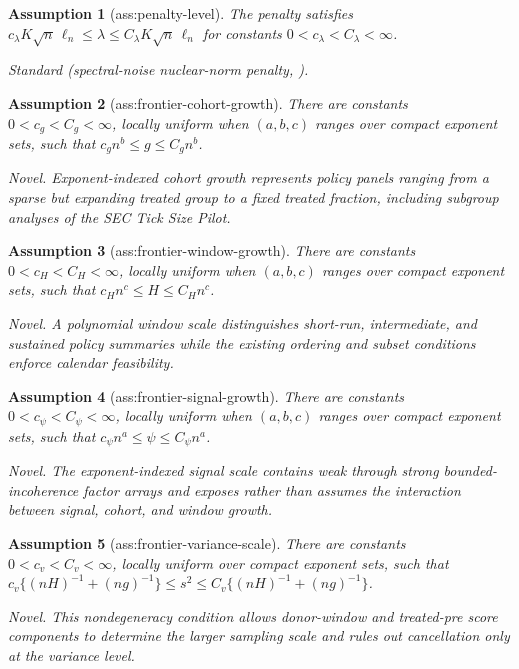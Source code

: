 \documentclass{article}
\newtheorem{assumption}{Assumption}
\begin{document}
\begin{assumption}[ass:penalty-level]\label{ass:penalty-level}
The penalty satisfies \(c_\lambda K\sqrt n\,\ell_n\le\lambda\le C_\lambda K\sqrt n\,\ell_n\) for constants \(0<c_\lambda<C_\lambda<\infty\).
\par\smallskip\noindent\emph{Standard} (spectral-noise nuclear-norm penalty, \cite{choiYuan2024MNAR}).
\end{assumption}

\begin{assumption}[ass:frontier-cohort-growth]\label{ass:frontier-cohort-growth}
There are constants \(0<c_g<C_g<\infty\), locally uniform when \((a,b,c)\) ranges over compact exponent sets, such that \(c_g n^b\le g\le C_g n^b\).
\par\smallskip\noindent\emph{Novel.} Exponent-indexed cohort growth represents policy panels ranging from a sparse but expanding treated group to a fixed treated fraction, including subgroup analyses of the SEC Tick Size Pilot.
\end{assumption}

\begin{assumption}[ass:frontier-window-growth]\label{ass:frontier-window-growth}
There are constants \(0<c_H<C_H<\infty\), locally uniform when \((a,b,c)\) ranges over compact exponent sets, such that \(c_H n^c\le H\le C_H n^c\).
\par\smallskip\noindent\emph{Novel.} A polynomial window scale distinguishes short-run, intermediate, and sustained policy summaries while the existing ordering and subset conditions enforce calendar feasibility.
\end{assumption}

\begin{assumption}[ass:frontier-signal-growth]\label{ass:frontier-signal-growth}
There are constants \(0<c_\psi<C_\psi<\infty\), locally uniform when \((a,b,c)\) ranges over compact exponent sets, such that \(c_\psi n^a\le\psi\le C_\psi n^a\).
\par\smallskip\noindent\emph{Novel.} The exponent-indexed signal scale contains weak through strong bounded-incoherence factor arrays and exposes rather than assumes the interaction between signal, cohort, and window growth.
\end{assumption}

\begin{assumption}[ass:frontier-variance-scale]\label{ass:frontier-variance-scale}
There are constants \(0<c_v<C_v<\infty\), locally uniform over compact exponent sets, such that \(c_v\{(nH)^{-1}+(ng)^{-1}\}\le s^2\le C_v\{(nH)^{-1}+(ng)^{-1}\}\).
\par\smallskip\noindent\emph{Novel.} This nondegeneracy condition allows donor-window and treated-pre score components to determine the larger sampling scale and rules out cancellation only at the variance level.
\end{assumption}
\end{document}
